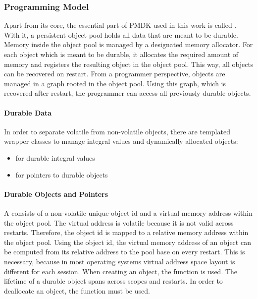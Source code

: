 \subsubsection{Programming Model}

Apart from its core, the essential part of PMDK used in this work is called
. With it, a persistent object pool holds all data that are meant
to be durable. Memory inside the object pool is managed by a designated memory
allocator. For each object which is meant to be durable, it allocates the
required amount of memory and registers the resulting object in the object pool.
This way, all objects can be recovered on restart. From a programmer
perspective, objects are managed in a graph rooted in the object pool. Using
this graph, which is recovered after restart, the programmer can access all
previously durable objects.

\paragraph{Durable Data}

In order to separate volatile from non-volatile objects, there are templated
wrapper classes to manage integral values and dynamically allocated objects:

\begin{itemize}
    \item {} for durable integral values
    \item {} for pointers to durable objects
\end{itemize}

\paragraph{Durable Objects and Pointers}

A  consists of a non-volatile unique object id and a
virtual memory address within the object pool. The virtual address is volatile
because it is not valid across restarts. Therefore, the object id is mapped to a
relative memory address within the object pool. Using the object id, the virtual
memory address of an object can be computed from its relative address to the
pool base on every restart. This is necessary, because in most operating systems
virtual address space layout is different for each session. When creating an
object, the function  is used. The lifetime of
a durable object spans across scopes and restarts. In order to deallocate an
object, the function  must be used.

